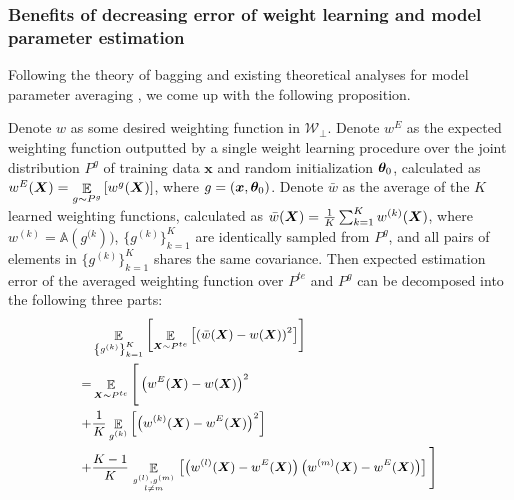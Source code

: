 \subsubsection{Benefits of decreasing error of weight learning and model parameter estimation}
\label{sec:benefits}
Following the theory of bagging \citep{ghojogh2019theory} and existing theoretical analyses for model parameter averaging \citep{rame2022diverse}, we come up with the following proposition. 
\begin{proposition}    
Denote $w$ as some desired weighting function in $\mathcal{W}_{\perp}$. 
Denote $w^E$ as the expected weighting function outputted by a single weight learning procedure over the joint distribution $P^g$ of training data $\boldsymbol{x}$ and random initialization $\boldsymbol{\theta}_0$, calculated as $w^E(\boldsymbol{X})=\mathop{\mathbb{E}}\limits_{g\sim P^g}\left [w^g(\boldsymbol{X})\right]$, where $g=(\boldsymbol{x}, \boldsymbol{\theta}_0)$. 
Denote $\bar{w}$ as the average of the $K$ learned weighting functions, calculated as $\bar{w}(\boldsymbol{X})=\frac1K \sum_{k=1}^K w^{(k)}(\boldsymbol{X})$, where $w^{(k)}=\mathbb{A}(g^{(k}))$, $\{g^{(k)}\}_{k=1}^K$ are identically sampled from $P^g$, and all pairs of elements in $\{g^{(k)}\}_{k=1}^K$ shares the same covariance. 
Then expected estimation error of the averaged weighting function over $P^{te}$ and $P^g$ can be decomposed into the following three parts:
\begin{equation} \label{eq:decomp}
\small
\begin{aligned}
&\mathop{\mathbb{E}}\limits_{\left\{g^{(k)}\right\}_{k=1}^K}\left [\mathop{\mathbb{E}}\limits_{\boldsymbol{X}\sim P^{te}}\left [(\bar{w}(\boldsymbol{X})-w(\boldsymbol{X}))^2\right]\right]\\
=& \mathop{\mathbb{E}}\limits_{\boldsymbol{X}\sim P^{te}}\Bigg[\left(w^E(\boldsymbol{X})-w(\boldsymbol{X})\right)^2\\
+&\frac1K \mathop{\mathbb{E}}\limits_{g^{(k)}}\left [\left(w^{(k)}(\boldsymbol{X})-w^E(\boldsymbol{X})\right)^2\right]\\
+&\frac{K-1}{K}\mathop{\mathbb{E}}\limits_{g^{(l)},g^{(m)} 
\atop 
l\neq m}\left [\left(w^{(l)}(\boldsymbol{X})-w^E(\boldsymbol{X})\right)\left(w^{(m)}(\boldsymbol{X})-w^E(\boldsymbol{X})\right)\right]\Bigg]
\end{aligned}
\end{equation}
\label{prop:decomp}
\end{proposition}

